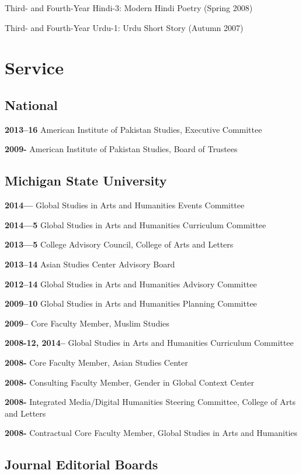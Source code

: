 \documentclass[letterpaper,12pt]{article}
\begin{document}
Third- and Fourth-Year Hindi-3: Modern Hindi Poetry (Spring 2008)

Third- and Fourth-Year Urdu-1: Urdu Short Story (Autumn 2007)


\section{Service%
  \label{service}%
}


\subsection{National%
  \label{national}%
}

\textbf{2013–16}
American Institute of Pakistan Studies, Executive Committee

\textbf{2009-}
American Institute of Pakistan Studies, Board of Trustees


\subsection{Michigan State University%
  \label{id2}%
}

\textbf{2014—}
Global Studies in Arts and Humanities Events Committee

\textbf{2014—5}
Global Studies in Arts and Humanities Curriculum Committee

\textbf{2013—5}
College Advisory Council, College of Arts and Letters

\textbf{2013–14}
Asian Studies Center Advisory Board

\textbf{2012–14}
Global Studies in Arts and Humanities Advisory Committee

\textbf{2009–10}
Global Studies in Arts and Humanities Planning Committee

\textbf{2009–}
Core Faculty Member, Muslim Studies

\textbf{2008-12, 2014–}
Global Studies in Arts and Humanities Curriculum Committee

\textbf{2008-}
Core Faculty Member, Asian Studies Center

\textbf{2008-}
Consulting Faculty Member, Gender in Global Context Center

\textbf{2008-}
Integrated Media/Digital Humanities Steering Committee, College of Arts and Letters

\textbf{2008-}
Contractual Core Faculty Member, Global Studies in Arts and Humanities


\subsection{Journal Editorial Boards%
  \label{journal-editorial-boards}%
}
\end{document}
